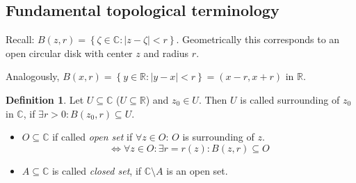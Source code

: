 \documentclass[a4paper,landscape,twocolumn]{article}
\theoremstyle{definition}
\newtheorem{defi}{Definition}
\newcommand\set[1]{\left\{#1\right\}}
\newcommand\abs[1]{\left|#1\right|}
\begin{document}
\subsection{Fundamental topological terminology}
%
Recall: $B(z, r) = \set{\zeta \in \mathbb C: \abs{z - \zeta} < r}$.
Geometrically this corresponds to an open circular disk with center $z$ and radius $r$.

Analogously, $B(x, r) = \set{y \in \mathbb R: \abs{y - x} < r} = (x-r, x+r)$
in $\mathbb R$.

\begin{defi}
  Let $U \subseteq \mathbb C$ ($U \subseteq \mathbb R$) and $z_0 \in U$.
  Then $U$ is called surrounding of $z_0$ in $\mathbb C$,
  if $\exists r > 0: B(z_0, r) \subseteq U$.
  \begin{itemize}
    \item
      $O \subseteq \mathbb C$ if called \emph{open set} if $\forall z \in O$:
      $O$ is surrounding of $z$.
      \[ \Leftrightarrow \forall z \in O: \exists r = r(z): B(z, r) \subseteq O \]
    \item
      $A \subseteq \mathbb C$ is called \emph{closed set}, if $\mathbb C \setminus A$
      is an open set.
  \end{itemize}
\end{defi}
\end{document}
